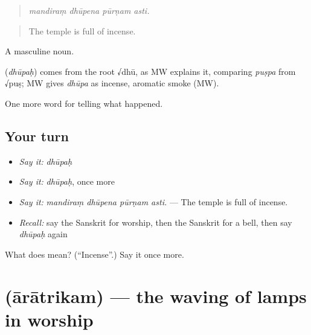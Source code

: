 \begin{quote}
   
\end{quote}

\begin{quote}
\emph{mandiraṃ dhūpena pūrṇam asti.}
\end{quote}

\begin{quote}
The temple is full of incense.
\end{quote}

A masculine noun.

\begin{cousinweb}
\textbf{} (\emph{dhūpaḥ}) comes from the root √dhū, as MW explains it, comparing \emph{puṣpa} from √puṣ; MW gives \emph{dhūpa} as incense, aromatic smoke (MW).
\end{cousinweb}

\begin{grammarlens}[title={What you've built}]
One more word for telling what happened.
\end{grammarlens}

\subsection*{Your turn}
\begin{itemize}
\raggedright
  \item \emph{Say it:} \emph{dhūpaḥ}
  \item \emph{Say it:} \emph{dhūpaḥ}, once more
  \item \emph{Say it:} \emph{mandiraṃ dhūpena pūrṇam asti.} — The temple is full of incense.
  \item \emph{Recall:} say the Sanskrit for worship, then the Sanskrit for a bell, then say \emph{dhūpaḥ} again
\end{itemize}

\begin{tcolorbox}[breakable,colback=teal!4,colframe=teal!35!black,title={Before you move on}]
What does  mean? (\textquotedblleft{}Incense\textquotedblright{}.) Say it once more.
\end{tcolorbox}
\section[\texorpdfstring{\sk{आरात्रिकम्} (ārātrikam)}{आरात्रिकम् (ārātrikam)}]{ (ārātrikam) — the waving of lamps in worship}

\label{lesson:SA-C329-aratrikam}



